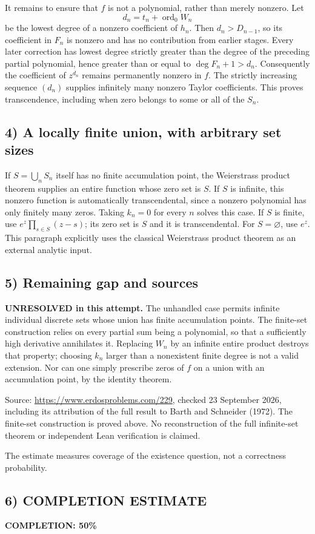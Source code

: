 It remains to ensure that $f$ is not a polynomial, rather than merely nonzero. Let
\[
 d_n=t_n+\operatorname{ord}_0W_n
\]
be the lowest degree of a nonzero coefficient of $h_n$. Then $d_n>D_{n-1}$, so its coefficient in $F_n$ is nonzero and has no contribution from earlier stages. Every later correction has lowest degree strictly greater than the degree of the preceding partial polynomial, hence greater than or equal to $\deg F_n+1>d_n$. Consequently the coefficient of $z^{d_n}$ remains permanently nonzero in $f$. The strictly increasing sequence $(d_n)$ supplies infinitely many nonzero Taylor coefficients. This proves transcendence, including when zero belongs to some or all of the $S_n$.

\subsection*{4) A locally finite union, with arbitrary set sizes}
If $S=\bigcup_n S_n$ itself has no finite accumulation point, the Weierstrass product theorem supplies an entire function whose zero set is $S$. If $S$ is infinite, this nonzero function is automatically transcendental, since a nonzero polynomial has only finitely many zeros. Taking $k_n=0$ for every $n$ solves this case. If $S$ is finite, use $e^z\prod_{s\in S}(z-s)$; its zero set is $S$ and it is transcendental. For $S=\varnothing$, use $e^z$. This paragraph explicitly uses the classical Weierstrass product theorem as an external analytic input.

\subsection*{5) Remaining gap and sources}
\textbf{UNRESOLVED in this attempt.} The unhandled case permits infinite individual discrete sets whose union has finite accumulation points. The finite-set construction relies on every partial sum being a polynomial, so that a sufficiently high derivative annihilates it. Replacing $W_n$ by an infinite entire product destroys that property; choosing $k_n$ larger than a nonexistent finite degree is not a valid extension. Nor can one simply prescribe zeros of $f$ on a union with an accumulation point, by the identity theorem.

Source: \url{https://www.erdosproblems.com/229}, checked 23 September 2026, including its attribution of the full result to Barth and Schneider (1972). The finite-set construction is proved above. No reconstruction of the full infinite-set theorem or independent Lean verification is claimed.

The estimate measures coverage of the existence question, not a correctness probability.
\subsection*{6) COMPLETION ESTIMATE}
\textbf{COMPLETION: 50\%}
